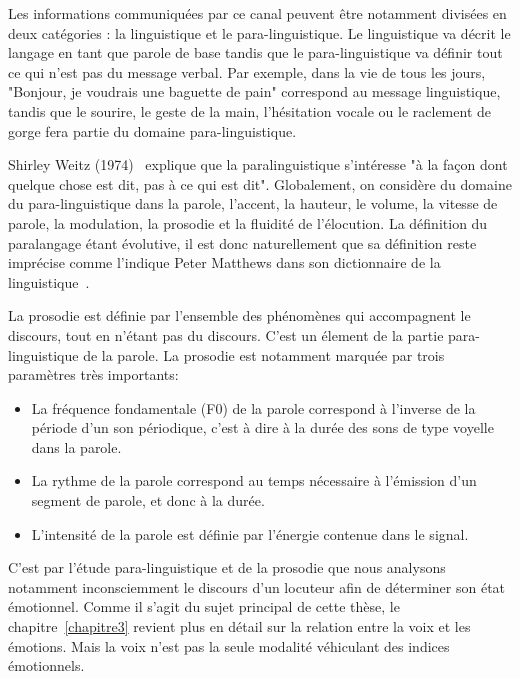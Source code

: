 Les informations communiquées par ce canal peuvent être notamment divisées en deux catégories : la linguistique et le para-linguistique.
Le linguistique va décrit le langage en tant que parole de base tandis que le para-linguistique va définir tout ce qui n'est pas du message verbal. Par exemple, dans la vie de tous les jours, "Bonjour, je voudrais une baguette de pain" correspond au message linguistique, tandis que le sourire, le geste de la main, l'hésitation vocale ou le raclement de gorge fera partie du domaine para-linguistique.

Shirley Weitz (1974)~\cite{Weitz1974} explique que la paralinguistique s'intéresse "à la façon dont quelque chose est dit, pas à ce qui est dit". Globalement, on considère du domaine du para-linguistique dans la parole, l'accent, la hauteur, le volume, la vitesse de parole, la modulation, la prosodie et la fluidité de l'élocution.
La définition du paralangage étant évolutive, il est donc naturellement que sa définition reste imprécise comme l'indique Peter Matthews dans son dictionnaire de la linguistique~\cite{Matthews2014}.

La prosodie est définie par l'ensemble des phénomènes qui accompagnent le discours, tout en n'étant pas du discours. C'est un élement de la partie para-linguistique de la parole. La prosodie est notamment marquée par trois paramètres très importants:
\begin{itemize}
  \item La fréquence fondamentale (F0) de la parole correspond à l'inverse de la période d'un son périodique, c'est à dire à la durée des sons de type voyelle dans la parole.
  \item La rythme de la parole correspond au temps nécessaire à l'émission d'un segment de parole, et donc à la durée.
  \item L'intensité de la parole est définie par l'énergie contenue dans le signal.
\end{itemize}
C'est par l'étude para-linguistique et de la prosodie que nous analysons notamment inconsciemment le discours d'un locuteur afin de déterminer son état émotionnel. Comme il s'agit du sujet principal de cette thèse, le chapitre~\ref{chapitre3} revient plus en détail sur la relation entre la voix et les émotions. Mais la voix n'est pas la seule modalité véhiculant des indices émotionnels.

